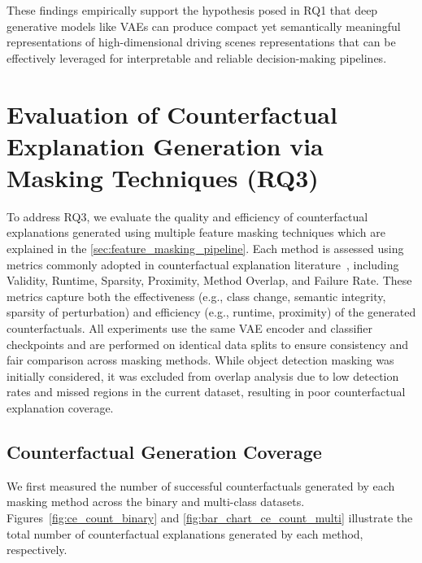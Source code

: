 These findings empirically support the hypothesis posed in RQ1 that deep generative models like VAEs can produce compact yet semantically meaningful representations of high-dimensional driving scenes representations that can be effectively leveraged for interpretable and reliable decision-making pipelines.





\vspace{1em}

\section{Evaluation of Counterfactual Explanation Generation via Masking Techniques (RQ3)} \label{sec:masking_eval}
To address RQ3, we evaluate the quality and efficiency of counterfactual explanations generated using multiple feature masking techniques which are explained in the \cref{sec:feature_masking_pipeline}. Each method is assessed using metrics commonly adopted in counterfactual explanation literature~\cite{DELANEY2023103995, chan2022comparativestudyfaithfulnessmetrics, Singh1622975, MARKUS2021103655, DBLP:journals/corr/abs-1905-07697}, including Validity, Runtime, Sparsity, Proximity, Method Overlap, and Failure Rate. These metrics capture both the effectiveness (e.g., class change, semantic integrity, sparsity of perturbation) and efficiency (e.g., runtime, proximity) of the generated counterfactuals.
All experiments use the same VAE encoder and classifier checkpoints and are performed on identical data splits to ensure consistency and fair comparison across masking methods.
While object detection masking was initially considered, it was excluded from overlap analysis due to low detection rates and missed regions in the current dataset, resulting in poor counterfactual explanation coverage.

\subsection{Counterfactual Generation Coverage}
We first measured the number of successful counterfactuals generated by each masking method across the binary and multi-class datasets. Figures~\ref{fig:ce_count_binary} and \ref{fig:bar_chart_ce_count_multi} illustrate the total number of counterfactual explanations generated by each method, respectively.

